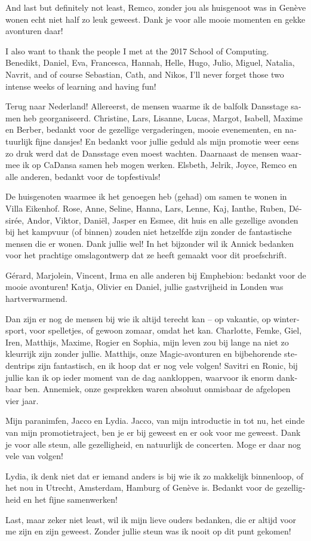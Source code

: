 And last but definitely not least, Remco, zonder jou als huisgenoot was in Genève wonen echt niet half zo leuk geweest.
Dank je voor alle mooie momenten en gekke avonturen daar!

I also want to thank the people I met at the 2017 \cern School of Computing.
Benedikt, Daniel, Eva, Francesca, Hannah, Helle, Hugo, Julio, Miguel, Natalia, Navrit, and of course Sebastian, Cath, and Nikos, I'll never forget those two intense weeks of learning and having fun!

\begin{otherlanguage}{dutch}
Terug naar Nederland!
Allereerst, de mensen waarme ik de balfolk Dansstage samen heb georganiseerd.
Christine, Lars, Lisanne, Lucas, Margot, Isabell, Maxime en Berber, bedankt voor de gezellige vergaderingen, mooie evenementen, en natuurlijk fijne dansjes!
En bedankt voor jullie geduld als mijn promotie weer eens zo druk werd dat de Dansstage even moest wachten.
Daarnaast de mensen waarmee ik op CaDansa samen heb mogen werken.
Elsbeth, Jelrik, Joyce, Remco en alle anderen, bedankt voor de topfestivals!

De huisgenoten waarmee ik het genoegen heb (gehad) om samen te wonen in Villa Eikenhof.
Rose, Anne, Seline, Hanna, Lars, Lenne, Kaj, Ianthe, Ruben, Désirée, Andor, Viktor, Daniël, Jasper en Esmee, dit huis en alle gezellige avonden bij het kampvuur (of binnen) zouden niet hetzelfde zijn zonder de fantastische mensen die er wonen.
Dank jullie wel!
In het bijzonder wil ik Annick bedanken voor het prachtige omslagontwerp dat ze heeft gemaakt voor dit proefschrift.

Gérard, Marjolein, Vincent, Irma en alle anderen bij Emphebion: bedankt voor de mooie avonturen!
Katja,  Olivier en Daniel, jullie gastvrijheid in Londen was hartverwarmend.

Dan zijn er nog de mensen bij wie ik altijd terecht kan -- op vakantie, op wintersport, voor spelletjes, of gewoon zomaar, omdat het kan.
Charlotte, Femke, Giel, Iren, Matthijs, Maxime, Rogier en Sophia, mijn leven zou bij lange na niet zo kleurrijk zijn zonder jullie.
Matthijs, onze Magic-avonturen en bijbehorende stedentrips zijn fantastisch, en ik hoop dat er nog vele volgen!
Savitri en Ronic, bij jullie kan ik op ieder moment van de dag aankloppen, waarvoor ik enorm dankbaar ben.
Annemiek, onze gesprekken waren absoluut onmisbaar de afgelopen vier jaar.

Mijn paranimfen, Jacco en Lydia.
Jacco, van mijn introductie in \lhcb tot nu, het einde van mijn promotietraject, ben je er bij geweest en er ook voor me geweest.
Dank je voor alle steun, alle gezelligheid, en natuurlijk de concerten.
Moge er daar nog vele van volgen!

Lydia, ik denk niet dat er iemand anders is bij wie ik zo makkelijk binnenloop, of het nou in Utrecht, Amsterdam, Hamburg of Genève is.
Bedankt voor de gezelligheid en het fijne samenwerken!

Last, maar zeker niet least, wil ik mijn lieve ouders bedanken, die er altijd voor me zijn en zijn geweest.
Zonder jullie steun was ik nooit op dit punt gekomen!

\end{otherlanguage}

